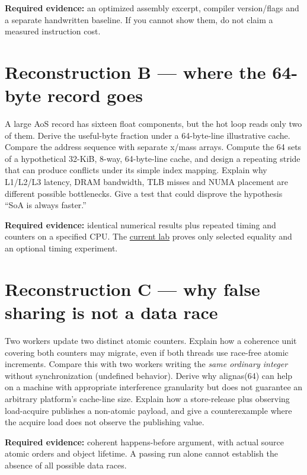 \textbf{Required evidence:} an optimized assembly excerpt, compiler version/flags and a separate handwritten baseline. If you cannot show them, do not claim a measured instruction cost.

\section{Reconstruction B --- where the 64-byte record goes}\label{appendix-2587680a4fe3-reconstruction-b-where-the-64-byte-record-goes}

A large AoS record has sixteen float components, but the hot loop reads only two of them. Derive the useful-byte fraction under a 64-byte-line illustrative cache. Compare the address sequence with separate x/mass arrays. Compute the 64 sets of a hypothetical 32-KiB, 8-way, 64-byte-line cache, and design a repeating stride that can produce conflicts under its simple index mapping. Explain why L1/L2/L3 latency, DRAM bandwidth, TLB misses and NUMA placement are different possible bottlenecks. Give a test that could disprove the hypothesis ``SoA is always faster.''

\textbf{Required evidence:} identical numerical results plus repeated timing and counters on a specified CPU. The \href{tools/labs/phase4_cpu_systems_lab.cpp}{current lab} proves only selected equality and an optional timing experiment.

\section{Reconstruction C --- why false sharing is not a data race}\label{appendix-2587680a4fe3-reconstruction-c-why-false-sharing-is-not-a-data-race}

Two workers update two distinct atomic counters. Explain how a coherence unit covering both counters may migrate, even if both threads use race-free atomic increments. Compare this with two workers writing the \emph{same ordinary integer} without synchronization (undefined behavior). Derive why alignas(64) can help on a machine with appropriate interference granularity but does not guarantee an arbitrary platform's cache-line size. Explain how a store-release plus observing load-acquire publishes a non-atomic payload, and give a counterexample where the acquire load does not observe the publishing value.

\textbf{Required evidence:} coherent happens-before argument, with actual source atomic orders and object lifetime. A passing run alone cannot establish the absence of all possible data races.

